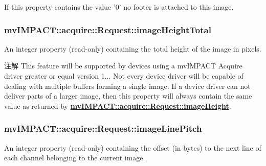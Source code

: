If this property contains the value '0' no footer is attached to this image. \hypertarget{classmv_i_m_p_a_c_t_1_1acquire_1_1_request_a84c5b14d9856295065bdd4efa2371484}{
\subsubsection[{image\+Height\+Total}]{ mv\+I\+M\+P\+A\+C\+T\+::acquire\+::\+Request\+::image\+Height\+Total}}\label{classmv_i_m_p_a_c_t_1_1acquire_1_1_request_a84c5b14d9856295065bdd4efa2371484}


An integer property {\bfseries }(read-\/only) containing the total height of the image in pixels. 

\begin{DoxyNote}{注解}
This feature will be supported by devices using a mv\+I\+M\+P\+A\+C\+T Acquire driver greater or equal version 1... Not every device driver will be capable of dealing with multiple buffers forming a single image. If a device driver can not deliver parts of a larger image, then this property will always contain the same value as returned by {\bfseries \hyperlink{classmv_i_m_p_a_c_t_1_1acquire_1_1_request_af7654539fb5277dec6f7b59fa428354f}{mv\+I\+M\+P\+A\+C\+T\+::acquire\+::\+Request\+::image\+Height}}. 
\end{DoxyNote}
\hypertarget{classmv_i_m_p_a_c_t_1_1acquire_1_1_request_ac94ef78b0834deb1f291dacc97c600bc}{
\subsubsection[{image\+Line\+Pitch}]{ mv\+I\+M\+P\+A\+C\+T\+::acquire\+::\+Request\+::image\+Line\+Pitch}}\label{classmv_i_m_p_a_c_t_1_1acquire_1_1_request_ac94ef78b0834deb1f291dacc97c600bc}


An integer property {\bfseries }(read-\/only) containing the offset (in bytes) to the next line of each channel belonging to the current image. 

